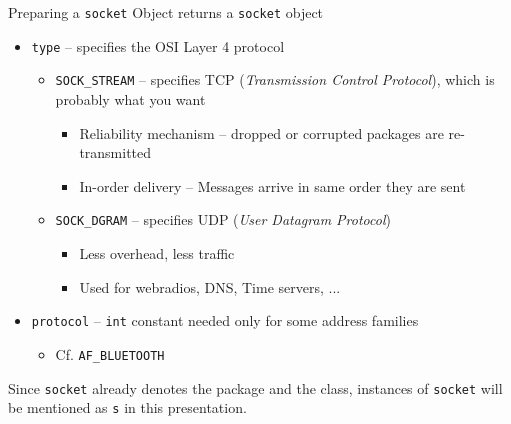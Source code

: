\begin{frame}{Preparing a \texttt{socket} Object}
%
 returns a \texttt{socket} object
\begin{itemize}
\item \texttt{type} -- specifies the OSI Layer 4 protocol
	\begin{itemize}
	\item \texttt{SOCK\_STREAM} -- specifies TCP (\emph{Transmission Control Protocol}), which is probably what you want
		\begin{itemize}
		\item Reliability mechanism -- dropped or corrupted packages are re-transmitted
		\item In-order delivery -- Messages arrive in same order they are sent
		\end{itemize}
	\item \texttt{SOCK\_DGRAM} -- specifies UDP (\emph{User Datagram Protocol})
		\begin{itemize}
		\item Less overhead, less traffic
		\item Used \zB for webradios, DNS, Time servers, ...
		\end{itemize}
	\end{itemize}
\item \texttt{protocol} -- \texttt{int} constant needed only for some address families
	\begin{itemize}
	\item Cf. \texttt{AF\_BLUETOOTH}
	\end{itemize}
\end{itemize}
%
\begin{hintbox}
\footnotesize
Since \texttt{socket} already denotes the package and the class, instances of \texttt{socket} will be mentioned as \texttt{s} in this presentation.
\end{hintbox}
%
\end{frame}


